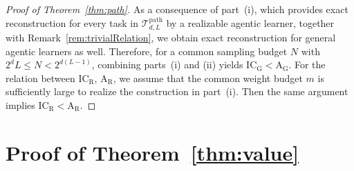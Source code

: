 \documentclass{article}
\newcommand{\ICG}{\mathrm{IC_G}}
\newcommand{\ICR}{\mathrm{IC_R}}
\newcommand{\AG}{\mathrm{A_G}}
\newcommand{\AR}{\mathrm{A_R}}
\begin{document}
\begin{proof}[Proof of Theorem~\ref{thm:path}]
As a consequence of part~(i), which provides exact reconstruction for every task in $\mathcal{T}_{d,L}^{\mathrm{path}}$ by a realizable agentic learner, together with Remark~\ref{rem:trivialRelation}, we obtain exact reconstruction for general agentic learners as well. Therefore, for a common sampling budget $N$ with $2^dL\leq N<2^{d(L-1)}$, combining parts~(i) and (ii) yields $\ICG<\AG$. 
For the relation between $\ICR$, $\AR$, we assume that the common weight budget $m$ is sufficiently large to realize the construction in part~(i). Then the same argument implies $\ICR<\AR$. 
\end{proof}


\section{Proof of Theorem~\ref{thm:value}} \label{appx:pointedvalue}
\end{document}

